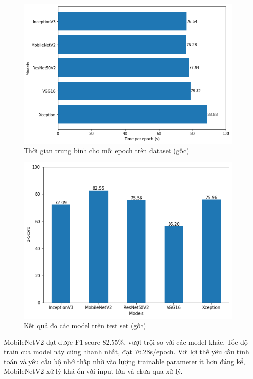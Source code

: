 \documentclass[a4paper,14pt]{extarticle}
\begin{document}
		\begin{figure}[H]
			\centering
			\includegraphics[scale=0.5]{images/original_time}
			\caption{Thời gian trung bình cho mỗi epoch trên dataset (gốc)}
		\end{figure}

		\begin{figure}[H]
			\centering
			\includegraphics[scale=0.6]{images/original_score}
			\caption{Kết quả đo các model trên test set (gốc)}
		\end{figure}

		MobileNetV2 đạt được F1-score 82.55\%, vượt trội so với các model khác. Tốc độ train của model này cũng nhanh nhất, đạt 76.28s/epoch. Với lợi thế yêu cầu tính toán và yêu cầu bộ nhớ thấp nhờ vào lượng trainable parameter ít hơn đáng kể, MobileNetV2 xử lý khá ổn với input lớn và chưa qua xử lý.
\end{document}
